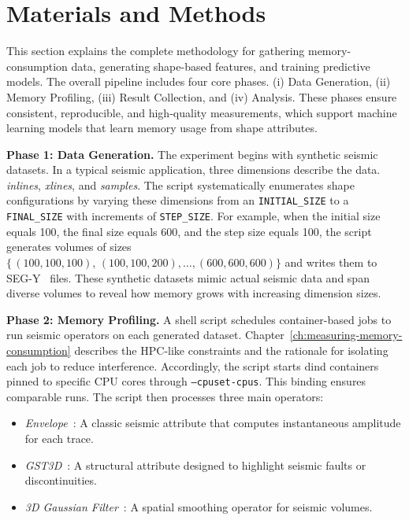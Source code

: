 \section{Materials and Methods}
\label{sec:pmc-materials-and-methods}

This section explains the complete methodology for gathering memory-consumption data, generating shape-based features, and training predictive models.
The overall pipeline includes four core phases.
(i) Data Generation,
(ii) Memory Profiling,
(iii) Result Collection,
and (iv) Analysis.
These phases ensure consistent, reproducible, and high-quality measurements, which support machine learning models that learn memory usage from shape attributes.

\vspace{1em}
\noindent
\textbf{Phase 1: Data Generation.}
The experiment begins with synthetic seismic datasets.
In a typical seismic application, three dimensions describe the data.
\emph{inlines}, \emph{xlines}, and \emph{samples}.
The script systematically enumerates shape configurations by varying these dimensions from an \texttt{INITIAL\_SIZE} to a \texttt{FINAL\_SIZE} with increments of \texttt{STEP\_SIZE}.
For example, when the initial size equals 100, the final size equals 600, and the step size equals 100, the script generates volumes of sizes
\(\{\,(100,100,100),\,(100,100,200),\dots,(600,600,600)\}\)
and writes them to \ac{SEG-Y}~\cite{barry1975segy} files.
These synthetic datasets mimic actual seismic data and span diverse volumes to reveal how memory grows with increasing dimension sizes.

\vspace{1em}
\noindent
\textbf{Phase 2: Memory Profiling.}
A shell script schedules container-based jobs to run seismic operators on each generated dataset.
Chapter~\ref{ch:measuring-memory-consumption} describes the \ac{HPC}-like constraints and the rationale for isolating each job to reduce interference.
Accordingly, the script starts \ac{dind} containers pinned to specific \ac{CPU} cores through \texttt{--cpuset-cpus}.
This binding ensures comparable runs.
The script then processes three main operators:

\begin{itemize}
    \item \emph{Envelope}~\cite{taner1979complex}: A classic seismic attribute that computes instantaneous amplitude for each trace.
    \item \emph{\ac{GST3D}}~\cite{bigun2004recognition}: A structural attribute designed to highlight seismic faults or discontinuities.
    \item \emph{3D Gaussian Filter}~\cite{gonzalez2002digital}: A spatial smoothing operator for seismic volumes.
\end{itemize}

